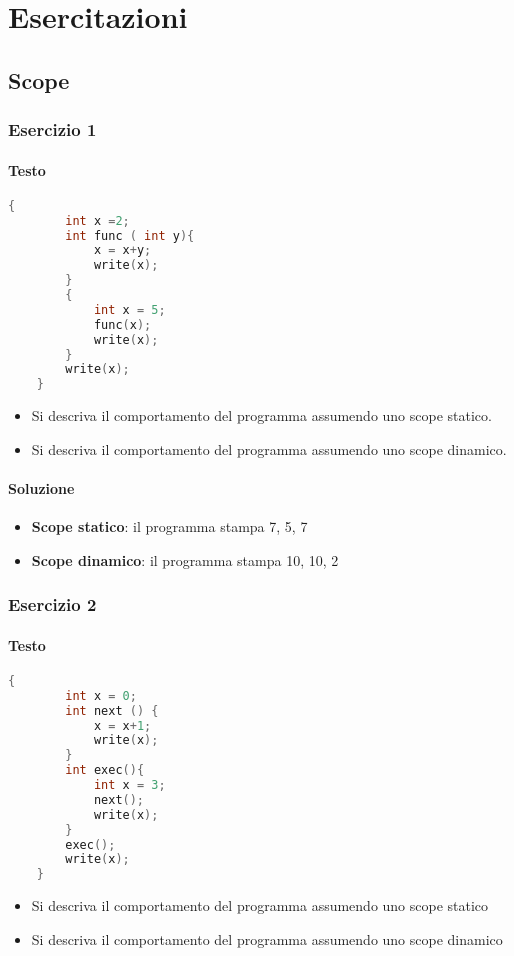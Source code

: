 \chapter{Esercitazioni}
\section{Scope}
\subsection{Esercizio 1}
\subsubsection{Testo}
\begin{lstlisting}[language=C]
    {
        int x =2;
        int func ( int y){
            x = x+y;
            write(x);
        }
        {
            int x = 5;
            func(x);
            write(x);
        }
        write(x);
    }
\end{lstlisting}

\begin{itemize}
    \item Si descriva il comportamento del programma assumendo uno scope statico.
    \item Si descriva il comportamento del programma assumendo uno scope dinamico.
\end{itemize}

\subsubsection{Soluzione}
\begin{itemize}
    \item \textbf{Scope statico}: il programma stampa 7, 5, 7
    \item \textbf{Scope dinamico}: il programma stampa 10, 10, 2
\end{itemize}
\subsection{Esercizio 2}
\subsubsection{Testo}
\begin{lstlisting}[language=C]
    {
        int x = 0;
        int next () {
            x = x+1;
            write(x);
        }
        int exec(){
            int x = 3;
            next();
            write(x);
        }
        exec();
        write(x);
    }
\end{lstlisting}
\begin{itemize}
    \item Si descriva il comportamento del programma assumendo uno scope statico
    \item Si descriva il comportamento del programma assumendo uno scope dinamico
\end{itemize}
